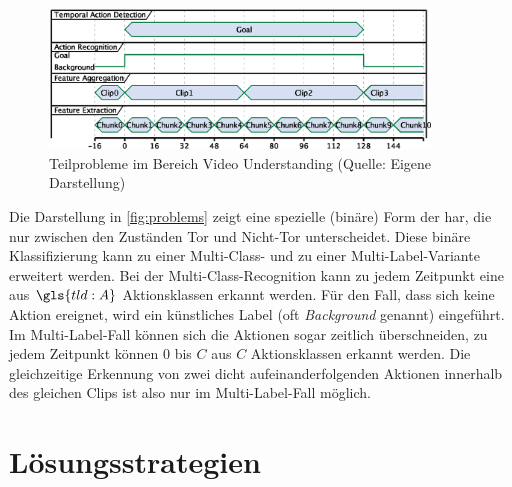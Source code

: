 \begin{figure}[htbp]
    \centering
    \includegraphics[width=0.9\textwidth, height=0.9\textwidth, keepaspectratio, interpolate]{fig/problems.eps}
    \caption[Teilprobleme im Bereich Video Understanding]{Teilprobleme im Bereich Video Understanding (Quelle: Eigene Darstellung)}
    \label{fig:problems}
\end{figure}

Die Darstellung in \autoref{fig:problems} zeigt eine spezielle (binäre) Form der \gls{har}, die nur zwischen den Zuständen Tor und Nicht-Tor unterscheidet.
Diese binäre Klassifizierung kann zu einer Multi-Class- und zu einer Multi-Label-Variante erweitert werden.
Bei der Multi-Class-Recognition kann zu jedem Zeitpunkt eine aus $\gls{tld:A}$ Aktionsklassen erkannt werden.
Für den Fall, dass sich keine Aktion ereignet, wird ein künstliches Label (oft \emph{Background} genannt) eingeführt.
Im Multi-Label-Fall können sich die Aktionen sogar zeitlich überschneiden, \dh zu jedem Zeitpunkt können $0$ bis $C$ aus $C$ Aktionsklassen erkannt werden.
Die gleichzeitige Erkennung von zwei dicht aufeinanderfolgenden Aktionen innerhalb des gleichen Clips ist also nur im Multi-Label-Fall möglich.


\section{Lösungsstrategien}
\label{sec:loesungsstrategien}

